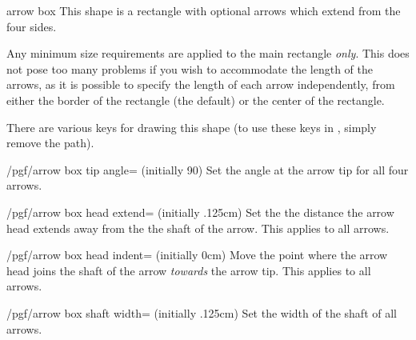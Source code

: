\begin{shape}{arrow box}
This shape is a rectangle with optional arrows which extend from the
four sides.

\begin{codeexample}[]
\end{codeexample}

Any minimum size requirements are applied to the main rectangle
\emph{only}. This does not pose too many problems if you wish to
accommodate the length of the arrows, as it is possible to specify 
the length of each arrow independently, from either the border of the
rectangle (the default) or the center of the rectangle.

\begin{codeexample}[]
\end{codeexample}

There are various \pgfname{} keys for drawing this shape (to use these
keys in \tikzname, simply remove the  path).

\begin{key}{/pgf/arrow box tip angle= (initially 90)}
  Set the angle at the arrow tip for all four arrows. 
\end{key}

\begin{key}{/pgf/arrow box head extend= (initially .125cm)}
  Set the the distance the arrow head extends away from the the shaft
  of the arrow. This applies to all arrows.
\end{key}

\begin{key}{/pgf/arrow box head indent= (initially 0cm)}
  Move the point where the arrow head joins the shaft of the arrow
  \emph{towards} the arrow tip. This applies to all arrows.
\end{key}

\begin{key}{/pgf/arrow box shaft width= (initially .125cm)}
  Set the width of the shaft of all arrows.
\end{key}


\end{shape}
